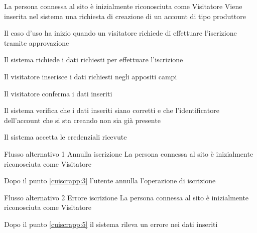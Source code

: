 \tabcuvspace


\tabcuvspace

{}
{La persona connessa al sito è inizialmente riconosciuta come Visitatore}
{Viene inserita nel sistema una richiesta di creazione di un account di tipo produttore}
{\begin{enumCU}
	\item Il caso d'uso ha inizio quando un visitatore richiede di effettuare l'iscrizione tramite approvazione
	\item Il sistema richiede i dati richiesti per effettuare l'iscrizione
	\item Il visitatore inserisce i dati richiesti negli appositi campi \label{cuiscrapp:3}
	\item Il visitatore conferma i dati inseriti
	\item Il sistema verifica che i dati inseriti siano corretti e che l'identificatore dell'account che si sta creando non sia già presente \label{cuiscrapp:5}
	\item Il sistema accetta le credenziali ricevute 
\end{enumCU}}
%
{Flusso alternativo 1}%
{Annulla iscrizione}%
{La persona connessa al sito è inizialmente riconosciuta come Visitatore}%
{\postNulle}%
{\begin{enumCU}
		\item Dopo il punto \ref{cuiscrapp:3} l'utente annulla l'operazione di iscrizione
	\end{enumCU}}%
%
{Flusso alternativo 2}%
{Errore iscrizione}%
{La persona connessa al sito è inizialmente riconosciuta come Visitatore}%
{\postNulle}%
{\begin{enumCU}
		\item Dopo il punto \ref{cuiscrapp:5} il sistema rileva un errore nei dati inseriti
	\end{enumCU}}%

\tabcuvspace

